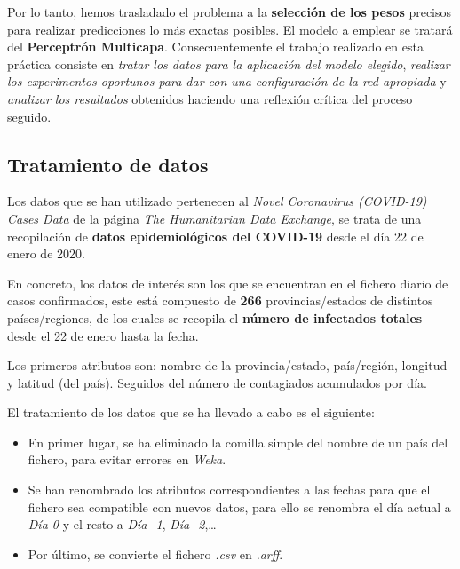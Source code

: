 \documentclass[12pt,a4paper, xcolor=table]{article}
\begin{document}
    Por lo tanto, hemos trasladado el problema a la \textbf{selección de los pesos} precisos para realizar predicciones lo más exactas posibles. El modelo a emplear se tratará del \textbf{Perceptrón Multicapa}. Consecuentemente el trabajo realizado en esta práctica consiste en \textit{tratar los datos para la aplicación del modelo elegido}, \textit{realizar los experimentos oportunos para dar con una configuración de la red apropiada} y \textit{analizar los resultados} obtenidos haciendo una reflexión crítica del proceso seguido.
        
    \newpage

    \subsection{Tratamiento de datos}

    Los datos que se han utilizado pertenecen al \textit{Novel Coronavirus (COVID-19) Cases Data} de la página \textit{The Humanitarian Data Exchange}, se trata de una recopilación de \textbf{datos epidemiológicos del COVID-19} desde el día 22 de enero de 2020.

    \vspace{3mm}

    En concreto, los datos de interés son los que se encuentran en el fichero diario de casos confirmados, este está compuesto de \textbf{266} provincias/estados de distintos países/regiones, de los cuales se recopila el \textbf{número de infectados totales} desde el 22 de enero hasta la fecha.  

    \vspace{1mm}

    Los primeros atributos son: nombre de la provincia/estado, país/región, longitud y latitud (del país). Seguidos del número de contagiados acumulados por día.

    \vspace{3mm}

    El tratamiento de los datos que se ha llevado a cabo es el siguiente:

    \begin{itemize}
        \item En primer lugar, se ha eliminado la comilla simple del nombre de un país del fichero, para evitar errores en \textit{Weka}.
        \item Se han renombrado los atributos correspondientes a las fechas para que el fichero sea compatible con nuevos datos, para ello se renombra el día actual a \textit{Día 0} y el resto a \textit{Día -1}, \textit{Día -2},\dots
        \item Por último, se convierte el fichero \textit{.csv} en \textit{.arff}.
    \end{itemize}
\end{document}
